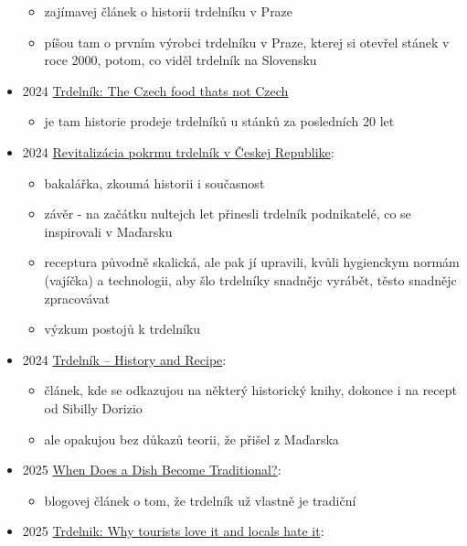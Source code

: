 \begin{itemize}
  \begin{itemize}
  \tightlist
  \item
    zajímavej článek o historii trdelníku v Praze
  \item
    píšou tam o prvním výrobci trdelníku v Praze, kterej si otevřel
    stánek v roce 2000, potom, co viděl trdelník na Slovensku
  \end{itemize}
\item
  2024
  \href{https://www.bbc.com/travel/article/20241014-trdelnik-the-czech-food-thats-not-czech}{Trdelník:
  The Czech food that\textquotesingle s not Czech}

  \begin{itemize}
  \tightlist
  \item
    je tam historie prodeje trdelníků u stánků za posledních 20 let
  \end{itemize}
\item
  2024
  \href{https://is.muni.cz/th/livm9/Bakalarska_praca.pdf}{Revitalizácia
  pokrmu trdelník v Českej Republike}:

  \begin{itemize}
  \tightlist
  \item
    bakalářka, zkoumá historii i současnost
  \item
    závěr - na začátku nultejch let přinesli trdelník podnikatelé, co se
    inspirovali v Maďarsku
  \item
    receptura původně skalická, ale pak jí upravili, kvůli hygienckym
    normám (vajíčka) a technologii, aby šlo trdelníky snadnějc vyrábět,
    těsto snadnějc zpracovávat
  \item
    výzkum postojů k trdelníku
  \end{itemize}
\item
  2024
  \href{https://www.czechology.com/trdelnik-history-and-recipe/}{Trdelník
  -- History and Recipe}:

  \begin{itemize}
  \tightlist
  \item
    článek, kde se odkazujou na některý historický knihy, dokonce i na
    recept od Sibilly Dorizio
  \item
    ale opakujou bez důkazů teorii, že přišel z Maďarska
  \end{itemize}
\item
  2025
  \href{https://medium.com/rooted-publication/when-does-a-dish-become-traditional-740fc377bef5}{When
  Does a Dish Become Traditional?}:

  \begin{itemize}
  \tightlist
  \item
    blogovej článek o tom, že trdelník už vlastně je tradiční
  \end{itemize}
\item
  2025 \href{https://www.youtube.com/watch?v=qUezTWRfAMc}{Trdelnik: Why
  tourists love it and locals hate it}:


\end{itemize}
